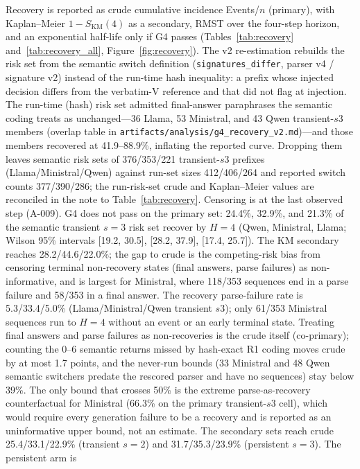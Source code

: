 \documentclass[a4paper,fleqn]{cas-sc}
\begin{document}
Recovery is reported as crude cumulative incidence Events/$n$ (primary), with
Kaplan--Meier $1-S_{\mathrm{KM}}(4)$ as a secondary, RMST over the four-step horizon, and an
exponential half-life only if G4 passes (Tables~\ref{tab:recovery} and~\ref{tab:recovery_all},
Figure~\ref{fig:recovery}). The v2 re-estimation rebuilds the risk set from the semantic
switch definition (\texttt{signatures\_differ}, parser v4 / signature v2) instead of the
run-time hash inequality: a prefix whose injected decision differs from the verbatim-V
reference and that did not flag at injection. The run-time (hash) risk set admitted
final-answer paraphrases the semantic coding treats as unchanged---36 Llama, 53 Ministral,
and 43 Qwen transient-$s3$ members (overlap table in
\texttt{artifacts/analysis/g4\_recovery\_v2.md})---and those members recovered at
41.9--88.9\%, inflating the reported curve. Dropping them leaves semantic risk sets of
376/353/221 transient-$s3$ prefixes (Llama/Ministral/Qwen) against run-set sizes 412/406/264
and reported switch counts 377/390/286; the run-risk-set crude and Kaplan--Meier values are
reconciled in the note to Table~\ref{tab:recovery}. Censoring is at the last observed step (A-009). G4 does not
pass on the primary set: 24.4\%, 32.9\%, and 21.3\% of the semantic transient $s=3$ risk set
recover by $H=4$ (Qwen, Ministral, Llama; Wilson 95\% intervals [19.2, 30.5], [28.2, 37.9],
[17.4, 25.7]). The KM secondary reaches 28.2/44.6/22.0\%; the gap to crude is the
competing-risk bias from censoring terminal non-recovery states (final answers, parse
failures) as non-informative, and is largest for Ministral, where 118/353 sequences end in a
parse failure and 58/353 in a final answer. The recovery parse-failure rate is 5.3/33.4/5.0\%
(Llama/Ministral/Qwen transient $s3$); only 61/353 Ministral sequences run to $H=4$ without an
event or an early terminal state. Treating final answers and parse failures as non-recoveries
is the crude itself (co-primary); counting the 0--6 semantic returns missed by hash-exact R1
coding moves crude by at most 1.7 points, and the never-run bounds (33 Ministral and 48 Qwen
semantic switchers predate the rescored parser and have no sequences) stay below 39\%. The only
bound that crosses 50\% is the extreme parse-as-recovery counterfactual for Ministral (66.3\% on
the primary transient-$s3$ cell), which would require every generation failure to be a recovery
and is reported as an uninformative upper bound, not an estimate. The
secondary sets reach crude 25.4/33.1/22.9\% (transient $s=2$) and 31.7/35.3/23.9\% (persistent
$s=3$). The persistent arm is
\end{document}
